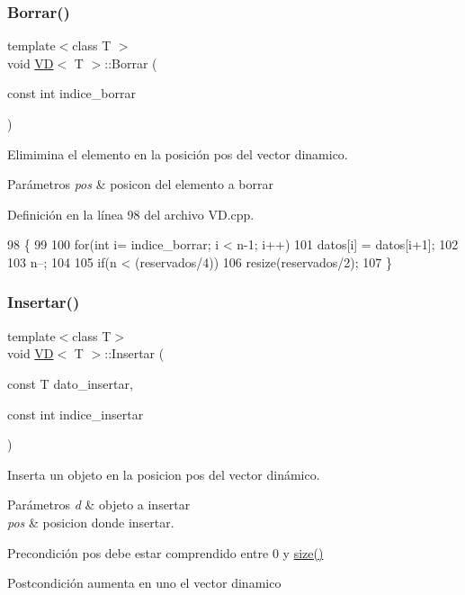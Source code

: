 \subsubsection{\texorpdfstring{Borrar()}{Borrar()}}
{\footnotesize\ttfamily template$<$class T $>$ \\
void \hyperlink{classVD}{VD}$<$ T $>$\+::Borrar (\begin{DoxyParamCaption}\item[{const int}]{indice\+\_\+borrar }\end{DoxyParamCaption})}



Elimimina el elemento en la posición pos del vector dinamico. 


\begin{DoxyParams}{Parámetros}
{\em pos} & posicon del elemento a borrar \\
\hline
\end{DoxyParams}


Definición en la línea 98 del archivo V\+D.\+cpp.


\begin{DoxyCode}
98                                          \{
99     
100     \textcolor{keywordflow}{for}(\textcolor{keywordtype}{int} i= indice\_borrar; i < n-1; i++)
101         datos[i] = datos[i+1];
102     
103     n--;
104     
105     \textcolor{keywordflow}{if}(n < (reservados/4))
106         resize(reservados/2);
107 \}
\end{DoxyCode}
\mbox{\label{classVD_a17d26b0f313f22b49b38ba1c8fd80e73}} 
\subsubsection{\texorpdfstring{Insertar()}{Insertar()}}
{\footnotesize\ttfamily template$<$class T$>$ \\
void \hyperlink{classVD}{VD}$<$ T $>$\+::Insertar (\begin{DoxyParamCaption}\item[{const T}]{dato\+\_\+insertar,  }\item[{const int}]{indice\+\_\+insertar }\end{DoxyParamCaption})}



Inserta un objeto en la posicion pos del vector dinámico. 


\begin{DoxyParams}{Parámetros}
{\em d} & objeto a insertar \\
\hline
{\em pos} & posicion donde insertar. \\
\hline
\end{DoxyParams}
\begin{DoxyPrecond}{Precondición}
pos debe estar comprendido entre 0 y \hyperlink{classVD_a411ad026db1c8e0617d9031f1f1017a5}{size()} 
\end{DoxyPrecond}
\begin{DoxyPostcond}{Postcondición}
aumenta en uno el vector dinamico 
\end{DoxyPostcond}


